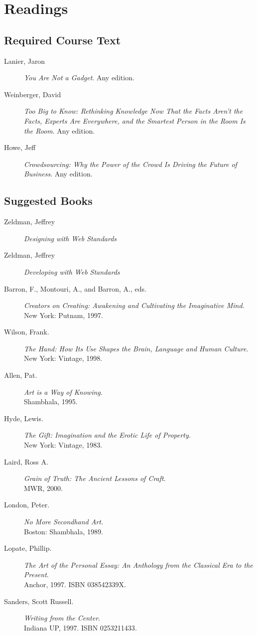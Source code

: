 \documentclass[letterpaper,10pt,headsepline]{scrreprt}
\begin{document}
\section{Readings}
\subsection{Required Course Text}

\begin{description}

\item [Lanier, Jaron] \textit{You Are Not a Gadget}. Any edition.
\item [Weinberger, David] \textit{Too Big to Know: Rethinking Knowledge Now That the Facts Aren't the Facts, Experts Are Everywhere, and the Smartest Person in the Room Is the Room}. Any edition.
\item [Howe, Jeff] \textit{Crowdsourcing: Why the Power of the Crowd Is Driving the Future of Business}. Any edition.
\end{description}

\subsection{Suggested Books}
\begin{description}

\item [Zeldman, Jeffrey] \textit{Designing with Web Standards}
\item [Zeldman, Jeffrey] \textit{Developing with Web Standards}
\item [Barron, F., Montouri, A., and Barron, A., eds.] \textit{Creators on Creating: Awakening and Cultivating the Imaginative Mind.} 
\\New York: Putnam, 1997.
\item[Wilson, Frank.] \textit{The Hand: How Its Use Shapes the Brain, Language and Human Culture.}
\\New York: Vintage, 1998.
\item [Allen, Pat.] \textit{Art is a Way of Knowing.} \\Shambhala, 1995.
\item [Hyde, Lewis.] \textit{The Gift: Imagination and the Erotic Life of Property.} 
\\New York: Vintage, 1983.
\item [Laird, Ross A.] \textit{Grain of Truth: The Ancient Lessons of Craft}. \\MWR, 2000.
\item [London, Peter.] \textit{No More Secondhand Art.} 
\\Boston: Shambhala, 1989.
\item [Lopate, Phillip.] \textit{The Art of the Personal Essay: An
    Anthology from the Classical Era to the Present}. \\Anchor, 1997.
  \textsc{ISBN 038542339X}.
\item [Sanders, Scott Russell.] \textit{Writing from the Center}.
  \\Indiana UP, 1997. \textsc{ISBN 0253211433}.
\end{description}
\end{document}
